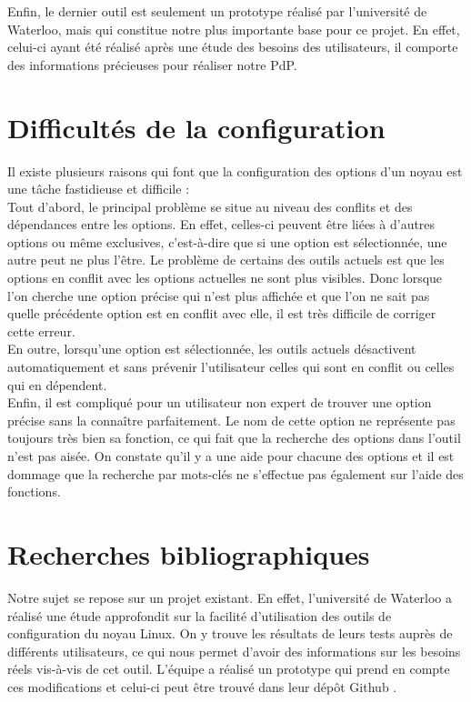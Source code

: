 \documentclass[16pts]{report}
\begin{document}
Enfin, le dernier outil est seulement un prototype réalisé par l'université de
Waterloo, mais qui constitue notre plus importante base pour ce projet. En
effet, celui-ci ayant été réalisé après une étude des besoins des utilisateurs,
il comporte des informations précieuses pour réaliser notre PdP.
\\

\section{Difficultés de la configuration}
\label{sec:Difficultés de la configuration}


Il existe plusieurs raisons qui font que la configuration des options d’un
noyau est une tâche fastidieuse et difficile :
\\

Tout d’abord, le principal problème se situe au niveau des conflits et des
dépendances entre les options. En effet, celles-ci peuvent être liées à
d’autres options ou même exclusives, c’est-à-dire que si une option est
sélectionnée, une autre peut ne plus l’être.  Le problème de certains des
outils actuels est que les options en conflit avec les options actuelles ne
sont plus visibles. Donc lorsque l’on cherche une option précise qui n’est plus
affichée et que l’on ne sait pas quelle précédente option est en conflit avec
elle, il est très difficile de corriger cette erreur.
\\

En outre, lorsqu'une option est sélectionnée, les outils actuels désactivent
automatiquement et sans prévenir l'utilisateur celles qui sont en conflit ou
celles qui en dépendent.
\\

Enfin, il est compliqué pour un utilisateur non expert de trouver une option
précise sans la connaître parfaitement. Le nom de cette option ne représente
pas toujours très bien sa fonction, ce qui fait que la recherche des options
dans l’outil n’est pas aisée.  On constate qu’il y a une aide pour chacune des
options et il est dommage que la recherche par mots-clés ne s’effectue pas
également sur l’aide des fonctions.
\\

\section{Recherches bibliographiques}
\label{sec:Recherches bibliographiques}


Notre sujet se repose sur un projet existant. En effet, l'université de
Waterloo a réalisé une étude approfondit \cite{Waterloo:Etude} sur la facilité
d'utilisation des outils de configuration du noyau Linux. On y trouve les
résultats de leurs tests auprès de différents utilisateurs, ce qui nous permet
d'avoir des informations sur les besoins réels vis-à-vis de cet outil. L'équipe
a réalisé un prototype qui prend en compte ces modifications et celui-ci peut
être trouvé dans leur dépôt Github \cite{Waterloo:Github}.
\\
\end{document}
